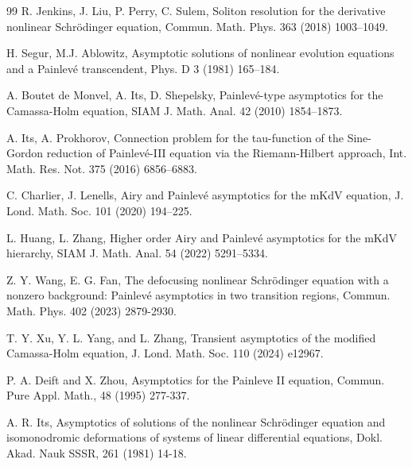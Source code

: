 \documentclass[11pt]{article}
\numberwithin{equation}{section}
\begin{document}
\begin{thebibliography}{99}
 R. Jenkins, J. Liu, P. Perry, C. Sulem, Soliton resolution for the derivative nonlinear Schr\"odinger equation, Commun. Math. Phys. 363 (2018) 1003--1049.

 H. Segur, M.J. Ablowitz, Asymptotic solutions of nonlinear evolution equations and a Painlev\'e transcendent, Phys. D 3 (1981) 165--184.


 A. Boutet de Monvel, A. Its, D. Shepelsky, Painlev\'e-type asymptotics for the Camassa-Holm equation, SIAM J. Math. Anal. 42 (2010) 1854--1873.

 A. Its, A. Prokhorov, Connection problem for the tau-function of the Sine-Gordon reduction of Painlev\'e-III equation via the Riemann-Hilbert approach, Int. Math. Res. Not. 375 (2016) 6856--6883.

 C. Charlier, J. Lenells, Airy and Painlev\'e asymptotics for the mKdV equation, J. Lond. Math. Soc. 101 (2020) 194--225.

 L. Huang, L. Zhang, Higher order Airy and Painlev\'e asymptotics for the mKdV hierarchy, SIAM J. Math. Anal. 54 (2022) 5291--5334.

  Z. Y. Wang, E. G. Fan,
   The defocusing nonlinear Schr\"{o}dinger equation with a nonzero background: Painlev\'{e} asymptotics in two transition regions, Commun. Math. Phys.  402 (2023) 2879-2930.



T. Y. Xu, Y. L. Yang, and L. Zhang,
 Transient asymptotics of the modified Camassa-Holm equation, J. Lond. Math. Soc.  110 (2024)  e12967.

	P. A. Deift and X. Zhou, Asymptotics for the Painleve II equation, Commun. Pure Appl. Math., 48 (1995)   277-337.

	  A. R. Its,   Asymptotics of solutions of the nonlinear {S}chr\"odinger
		equation and isomonodromic deformations of systems of linear differential
		equations, Dokl. Akad. Nauk SSSR, 261 (1981)   14-18.

\end{thebibliography}
\end{document}
